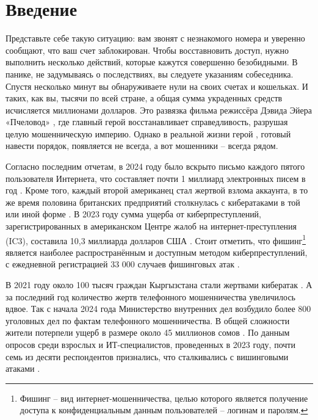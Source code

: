 \section*{\centering Введение}

Представьте себе такую ситуацию: вам звонят с незнакомого номера и уверенно сообщают, что ваш счет заблокирован. Чтобы восставновить доступ, нужно выполнить несколько действий, которые кажутся совершенно безобидными. В панике, не задумываясь о последствиях, вы следуете указаниям собеседника. Спустя несколько минут вы обнаруживаете нули на своих счетах и кошельках. И таких, как вы, тысячи по всей стране, а общая сумма украденных средств исчисляется миллионами долларов. Это развязка фильма режиссёра Дэвида Эйера «Пчеловод» \cite{beekeeper2024}, где главный герой восстанавливает справедливость, разрушая целую мошенническую империю. Однако в реальной жизни герой \cite{fraud2024}, готовый навести порядок, появляется не всегда, а вот мошенники – всегда рядом.

Согласно последним отчетам, в 2024 году было вскрыто письмо каждого пятого пользователя Интернета, что составляет почти 1 миллиард электронных писем в год \cite{griffiths2024phishing}. Кроме того, каждый второй американец стал жертвой взлома аккаунта, в то же время половина британских предприятий столкнулась с кибератаками в той или иной форме \cite{griffiths2024cybercrime}. В 2023 году сумма ущерба от киберпреступлений, зарегистрированных в американском Центре жалоб на интернет-преступления (IC3), составила 10,3 миллиарда долларов США \cite{petrosyan2023}. Стоит отметить, что фишинг\footnote{Фишинг –  вид интернет-мошенничества, целью которого является получение доступа к конфиденциальным данным пользователей – логинам и паролям.} является наиболее распространённым и доступным методом киберпреступлений, с ежедневной регистрацией 33 000 случаев фишинговых атак \cite{lewis2018}. 

В 2021 году около 100 тысяч граждан Кыргызстана стали жертвами кибератак \cite{kopytin2023}. А за последний год количество жертв телефонного мошенничества увеличилось вдвое. Так с начала 2024 года Министерство внутренних дел возбудило более 800 уголовных дел по фактам телефонного мошенничества. В общей сложности жители потерпели ущерб в размере около 45 миллионов сомов \cite{amatbekova2024}. По данным опросов среди взрослых и ИТ-специалистов, проведенных в 2023 году, почти семь из десяти респондентов признались, что сталкивались с вишинговыми атаками \cite{petrosyan2024}.

